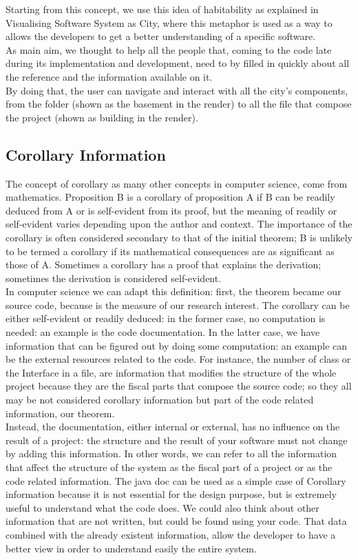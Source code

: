 \documentclass[]{usiinfbachelorproject}
\begin{document}
Starting from this concept, we use this idea of habitability as explained in \cite{vssac} Visualising Software System as City, where this metaphor is used as a way to allows the developers to get a better understanding of a specific software. \\
As main aim, we thought to help all the people that, coming to the code late during its implementation and development, need to by filled in quickly about all the reference and the information available on it.\\
By doing that, the user can navigate and interact with all the city's components, from the folder (shown as the basement in the render) to all the file that compose the project (shown as building in the render). 


\subsection{Corollary Information} 
The concept of corollary as many other concepts in computer science, come from mathematics. Proposition B is a corollary of proposition A if B can be readily deduced from A or is self-evident from its proof, but the meaning of readily or self-evident varies depending upon the author and context. The importance of the corollary is often considered secondary to that of the initial theorem; B is unlikely to be termed a corollary if its mathematical consequences are as significant as those of A. Sometimes a corollary has a proof that explains the derivation; sometimes the derivation is considered self-evident. \cite{wikiCory} \\
In computer science we can adapt this definition: first, the theorem became our source code, because is the measure of our research interest. The corollary can be either  self-evident or  readily deduced:
in the former case, no computation is needed: an example is the code documentation. In the latter case, we have  information that  can be figured out by doing some computation: an example can be the external resources related to the code.
For instance, the number of class or the Interface in a file, are information that modifies the structure of the whole project because they are the fiscal parts that compose the source code; so they all may be not considered corollary information but part of the code related information, our theorem.\\
Instead, the documentation, either internal or external, has no influence on the result of a project: the structure and the result of your software must not change by adding this information. In other words, we can refer to all the information that affect the structure of the system as the fiscal part of a project or as the code related information. The java doc can be used as a simple case of Corollary information because it is not essential for the design purpose, but is extremely useful to understand what the code does. We could also think about other information that are not written, but could be found using your code. That data combined with the already existent information, allow the developer to have a better view in order to understand easily the entire system.
\end{document}
